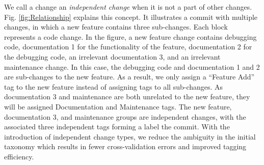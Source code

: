 We call a change an \textit{independent change} when it is not a part of other changes.
Fig. \ref{fig:Relationship} explains this concept. It illustrates a commit with multiple changes, in which a new feature contains three sub-changes.
Each block represents a code change. 
In the figure, a new feature change contains debugging code, documentation 1 for the functionality of the feature, documentation 2 for the debugging code, an irrelevant documentation 3, and an irrelevant maintenance change. 
In this case, the debugging code and documentation 1 and 2 are sub-changes to the new feature. 
As a result, we only assign a ``Feature Add'' tag to the new feature instead of assigning tags to all sub-changes. 
As documentation 3 and maintenance are both unrelated to the new feature, they will be assigned Documentation and Maintenance tags.
The new feature, documentation 3, and maintenance groups are independent changes, with the associated three independent tags forming a label the commit. 
With the introduction of independent change types, we reduce the ambiguity in the initial taxonomy which results in fewer cross-validation errors and improved tagging efficiency.
